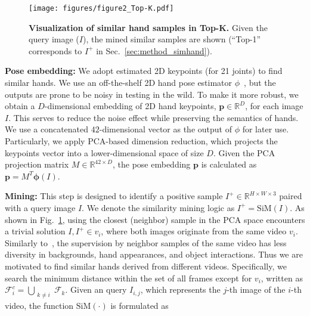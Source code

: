 \begin{figure}[t!]
\vspace{-2mm}
    \begin{center}
    \texttt{[image: figures/figure2\_Top-K.pdf]}
    \end{center}
    \vspace{-3mm}
    \caption{
    \textbf{Visualization of similar hand samples in Top-K.}
    Given the query image ($I$), the mined similar samples are shown (``Top-1'' corresponds to $I^+$ in Sec.~\ref{sec:method_simhand}).
   }
    \label{fig:Top-K}
    \vspace{-3mm}
\end{figure}

\textbf{Pose embedding:}
We adopt estimated 2D keypoints (for 21 joints) to find similar hands.
We use an off-the-shelf 2D hand pose estimator \(\phi\)~\citep{lugaresi:arxiv19}, but the outputs are prone to be noisy in testing in the wild.
To make it more robust, we obtain a $D$-dimensional embedding of 2D hand keypoints, $\mathbf{p} \in \mathbb{R}^{D}$, for each image $I$.
This serves to reduce the noise effect while preserving the semantics of hands.
We use a concatenated \(42\)-dimensional vector as the output of \(\phi\) for later use. 
Particularly, we apply PCA-based dimension reduction, which projects the keypoints vector into a lower-dimensional space of size \(D\). 
Given the PCA projection matrix \(M \in \mathbb{R}^{42 \times D}\), the pose embedding \(\mathbf{p}\) is calculated as \(\mathbf{p} = M^{T} \mathbf{\phi}(I)\). 

\textbf{Mining:}
This step is designed to identify a positive sample $I^+ \in \mathbb{R}^{H \times W \times 3}$ paired with a query image $I$. We denote the similarity mining logic as $I^+ = \mathrm{SiM} (I)$. As shown in Fig.~\ref{fig:Top-K}, using the closest (neighbor) sample in the PCA space encounters a trivial solution $I,I^+ \in v_i$, where both images originate from the same video $v_i$. Similarly to~\citep{ziani:3dv22}, the supervision by neighbor samples of the same video has less diversity in backgrounds, hand appearances, and object interactions. Thus we are motivated to find similar hands derived from different videos. Specifically, we search the minimum distance within the set of all frames except for $v_i$, written as $\mathcal{F}^{c}_{i} = \bigcup_{\substack{k \neq i}} \mathcal{F}_{k}$. Given an query $I_{i,j}$, which represents the $j$-th image of the $i$-th video, the function $\mathrm{SiM}(\cdot)$ is formulated as

